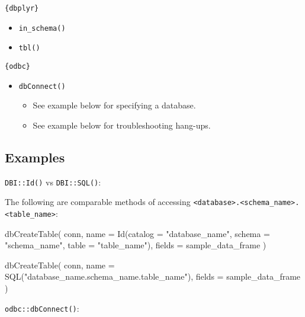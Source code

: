 \documentclass[
]{book}
\newenvironment{Shaded}{\begin{snugshade}}{\end{snugshade}}
\newcommand{\AttributeTok}[1]{\textcolor[rgb]{0.77,0.63,0.00}{#1}}
\newcommand{\FunctionTok}[1]{\textcolor[rgb]{0.00,0.00,0.00}{#1}}
\newcommand{\NormalTok}[1]{#1}
\newcommand{\StringTok}[1]{\textcolor[rgb]{0.31,0.60,0.02}{#1}}
\providecommand{\tightlist}{%
  \setlength{\itemsep}{0pt}\setlength{\parskip}{0pt}}
\begin{document}
\texttt{\{dbplyr\}}

\begin{itemize}
\tightlist
\item
  \texttt{in\_schema()}
\item
  \texttt{tbl()}
\end{itemize}

\texttt{\{odbc\}}

\begin{itemize}
\tightlist
\item
  \texttt{dbConnect()}

  \begin{itemize}
  \tightlist
  \item
    See example below for specifying a database.
  \item
    See example below for troubleshooting hang-ups.
  \end{itemize}
\end{itemize}

\hypertarget{examples-1}{%
\subsection{Examples}\label{examples-1}}

\texttt{DBI::Id()} vs \texttt{DBI::SQL()}:

The following are comparable methods of accessing \texttt{\textless{}database\textgreater{}.\textless{}schema\_name\textgreater{}.\textless{}table\_name\textgreater{}}:

\begin{Shaded}
\begin{Highlighting}[]
\FunctionTok{dbCreateTable}\NormalTok{(}
\NormalTok{  conn,}
  \AttributeTok{name =} 
    \FunctionTok{Id}\NormalTok{(}\AttributeTok{catalog =} \StringTok{"database\_name"}\NormalTok{, }\AttributeTok{schema =} \StringTok{"schema\_name"}\NormalTok{, }\AttributeTok{table =} \StringTok{"table\_name"}\NormalTok{),}
  \AttributeTok{fields =}\NormalTok{ sample\_data\_frame}
\NormalTok{)}

\FunctionTok{dbCreateTable}\NormalTok{(}
\NormalTok{  conn,}
  \AttributeTok{name =} \FunctionTok{SQL}\NormalTok{(}\StringTok{"database\_name.schema\_name.table\_name"}\NormalTok{),}
  \AttributeTok{fields =}\NormalTok{ sample\_data\_frame}
\NormalTok{)}
\end{Highlighting}
\end{Shaded}

\texttt{odbc::dbConnect()}:
\end{document}
